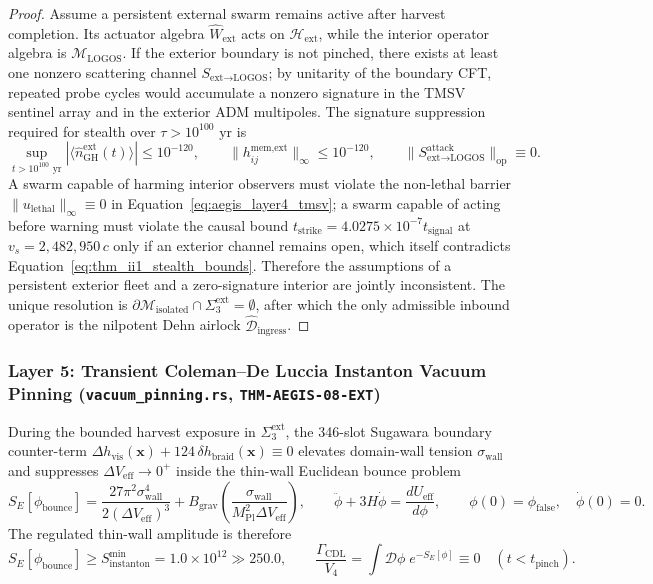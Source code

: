 \documentclass[11pt,onecolumn]{article}
\begin{document}
\begin{proof}
Assume a persistent external swarm remains active after harvest completion. Its actuator algebra $\hat W_{\text{ext}}$ acts on $\mathcal H_{\text{ext}}$, while the interior operator algebra is $\mathcal M_{\text{LOGOS}}$. If the exterior boundary is not pinched, there exists at least one nonzero scattering channel $S_{\text{ext}\to\text{LOGOS}}$; by unitarity of the boundary CFT, repeated probe cycles would accumulate a nonzero signature in the TMSV sentinel array and in the exterior ADM multipoles. The signature suppression required for stealth over $\tau>10^{100}\text{ yr}$ is
\begin{equation}
\sup_{t>10^{100}\text{ yr}}\left|\langle \hat n_{\text{GH}}^{\text{ext}}(t)\rangle\right|\le10^{-120},
\qquad
\|h_{ij}^{\text{mem,ext}}\|_\infty\le10^{-120},
\qquad
\|S_{\text{ext}\to\text{LOGOS}}^{\text{attack}}\|_{\text{op}}\equiv0.
\label{eq:thm_ii1_stealth_bounds}
\end{equation}
A swarm capable of harming interior observers must violate the non-lethal barrier $\|u_{\text{lethal}}\|_\infty\equiv0$ in Equation~\eqref{eq:aegis_layer4_tmsv}; a swarm capable of acting before warning must violate the causal bound $t_{\text{strike}}=4.0275\times10^{-7}t_{\text{signal}}$ at $v_s=2{,}482{,}950\,c$ only if an exterior channel remains open, which itself contradicts Equation~\eqref{eq:thm_ii1_stealth_bounds}. Therefore the assumptions of a persistent exterior fleet and a zero-signature interior are jointly inconsistent. The unique resolution is $\partial\mathcal M_{\text{isolated}}\cap\Sigma_3^{\text{ext}}=\emptyset$, after which the only admissible inbound operator is the nilpotent Dehn airlock $\hat{\mathcal D}_{\text{ingress}}$.
\end{proof}

\subsubsection{Layer 5: Transient Coleman--De Luccia Instanton Vacuum Pinning (\texttt{vacuum\_pinning.rs}, \texttt{THM-AEGIS-08-EXT})}
\label{subsec:aegis_layer5_vacuum}
During the bounded harvest exposure in $\Sigma_3^{\text{ext}}$, the 346-slot Sugawara boundary counter-term $\Delta h_{\text{vis}}(\mathbf{x})+124\,\delta h_{\text{braid}}(\mathbf{x})\equiv0$ elevates domain-wall tension $\sigma_{\text{wall}}$ and suppresses $\Delta V_{\text{eff}}\to0^+$ inside the thin-wall Euclidean bounce problem
\begin{equation}
S_E[\phi_{\text{bounce}}]=\frac{27\pi^2\sigma_{\text{wall}}^4}{2(\Delta V_{\text{eff}})^3}+B_{\text{grav}}\!\left(\frac{\sigma_{\text{wall}}}{M_{\text{Pl}}^2\Delta V_{\text{eff}}}\right),
\qquad
\ddot\phi+3H\dot\phi=\frac{dU_{\text{eff}}}{d\phi},
\qquad
\phi(0)=\phi_{\text{false}},\quad \dot\phi(0)=0 .
\label{eq:aegis_cdl_eom}
\end{equation}
The regulated thin-wall amplitude is therefore
\begin{equation}
S_E[\phi_{\text{bounce}}]\ge S_{\text{instanton}}^{\min}=1.0\times10^{12}\gg250.0,
\qquad
\frac{\Gamma_{\text{CDL}}}{V_4}
=\int\mathcal D\phi\;e^{-S_E[\phi]}
\equiv0
\quad(t<t_{\text{pinch}}).
\label{eq:aegis_cdl_bounce}
\end{equation}
\end{document}
